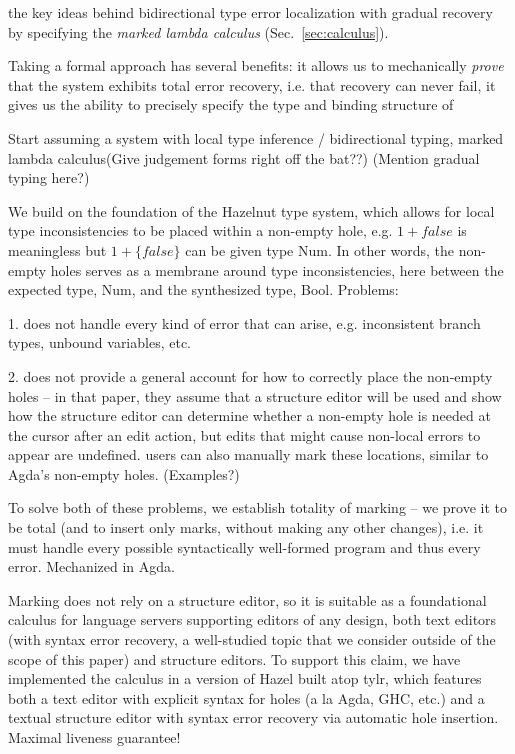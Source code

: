 the key ideas behind bidirectional type error localization with gradual recovery by specifying 
the \emph{marked lambda calculus} (Sec.~\ref{sec:calculus}). 


Taking a formal approach has several benefits: it allows us to mechanically \emph{prove} that the system exhibits total error recovery, i.e. that recovery can never fail, 
it gives us the ability to precisely specify the type and binding structure of 


Start assuming a system with local type inference / bidirectional typing, marked lambda calculus(Give judgement forms right off the bat??) 
(Mention gradual typing here?)

We build on the foundation of the Hazelnut type system, which allows for local type inconsistencies to be placed within a non-empty hole, 
e.g. $1 + false$ is meaningless but $1 + \{false\}$ can be given type Num. In other words, the non-empty holes serves as a membrane around type inconsistencies, here between the expected type, Num, and the synthesized type, Bool. Problems:

1. does not handle every kind of error that can arise, e.g. inconsistent branch types, unbound variables, etc.

2. does not provide a general account for how to correctly place the non-empty holes -- in that paper, they assume that a structure editor will be used and show how the structure editor can determine whether a non-empty hole is needed at the cursor after an edit action, but edits that might cause non-local errors to appear are undefined. users can also manually mark these locations, similar to Agda's non-empty holes. (Examples?)

To solve both of these problems, we establish totality of marking -- we prove it to be total (and to insert only marks, without making any other changes), i.e. it must handle 
every possible syntactically well-formed program and thus every error. Mechanized in Agda.

Marking does not rely on a structure editor, so it is suitable as a foundational calculus for language servers supporting editors of any 
design, both text editors (with syntax error recovery, a well-studied topic that we consider outside of the scope of this paper) and structure editors. To support this claim, we have implemented the calculus in a version of Hazel built atop tylr, which features both a text editor with explicit syntax for holes (a la Agda, GHC, etc.) and a textual structure editor with syntax error recovery via automatic hole insertion. Maximal liveness guarantee! 

